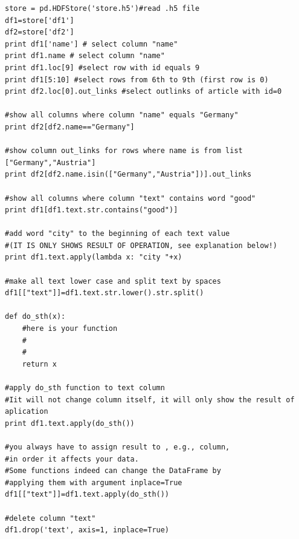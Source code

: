 \documentclass{WeSTassignment}
\begin{document}
\begin{enumerate}
\begin{lstlisting}
store = pd.HDFStore('store.h5')#read .h5 file
df1=store['df1'] 
df2=store['df2'] 
print df1['name'] # select column "name"
print df1.name # select column "name"
print df1.loc[9] #select row with id equals 9 
print df1[5:10] #select rows from 6th to 9th (first row is 0) 
print df2.loc[0].out_links #select outlinks of article with id=0 

#show all columns where column "name" equals "Germany"
print df2[df2.name=="Germany"]

#show column out_links for rows where name is from list ["Germany","Austria"]
print df2[df2.name.isin(["Germany","Austria"])].out_links 

#show all columns where column "text" contains word "good" 
print df1[df1.text.str.contains("good")]

#add word "city" to the beginning of each text value 
#(IT IS ONLY SHOWS RESULT OF OPERATION, see explanation below!)
print df1.text.apply(lambda x: "city "+x)

#make all text lower case and split text by spaces
df1[["text"]]=df1.text.str.lower().str.split()

def do_sth(x):
	#here is your function
	#
	#
	return x
    
#apply do_sth function to text column 
#Iit will not change column itself, it will only show the result of aplication	
print df1.text.apply(do_sth())

#you always have to assign result to , e.g., column, 
#in order it affects your data.
#Some functions indeed can change the DataFrame by 
#applying them with argument inplace=True
df1[["text"]]=df1.text.apply(do_sth())  

#delete column "text"
df1.drop('text', axis=1, inplace=True)
\end{lstlisting}

\end{enumerate}







\makefooter
\end{document}
